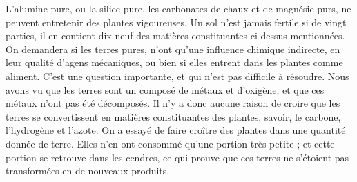 L'alumine pure, ou la silice pure, les carbonates de chaux et de magnésie purs, ne peuvent entretenir des plantes vigoureuses.
Un sol n'est jamais fertile si de vingt parties, il en contient dix-neuf des matières constituantes ci-dessus mentionnées.
On demandera si les terres pures, n'ont qu'une influence chimique indirecte, en leur qualité d'agens mécaniques, ou bien si elles entrent dans les plantes comme aliment. C'est une question importante, et qui n'est pas difficile à résoudre.
Nous avons vu que les terres sont un composé de métaux et d'oxigène, et que ces métaux n'ont pas été décomposés. Il n'y a donc aucune raison de croire que les terres se convertissent en matières constituantes des plantes, savoir, le carbone, l'hydrogène et l'azote.
On a essayé de faire croître des plantes dans une quantité donnée de terre. Elles n'en ont consommé qu'une portion très-petite ; et cette portion se retrouve dans les cendres, ce qui prouve que ces terres ne s'étoient pas transformées en de nouveaux produits.
